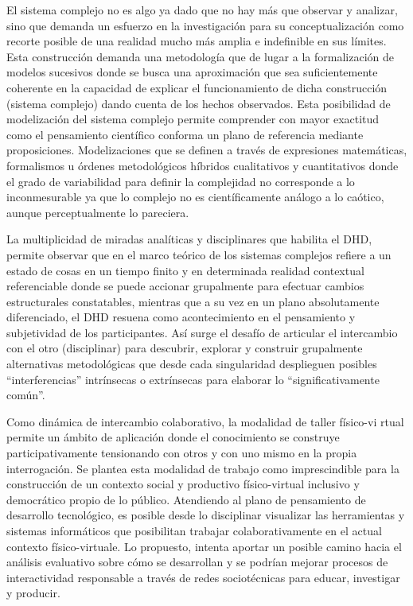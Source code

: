 El sistema complejo no es algo ya dado que no hay más que observar y analizar,
sino que demanda un esfuerzo en la investigación para su conceptualización como
recorte posible de una realidad mucho más amplia e indefinible en sus límites.
Esta construcción demanda una metodología que de lugar a la formalización de
modelos  sucesivos  donde   se  busca   una   aproximación  que   sea
suficientemente coherente en la capacidad de explicar el funcionamiento
de dicha construcción (sistema complejo) dando cuenta de los hechos
observados. Esta posibilidad de modelización del sistema complejo permite
comprender con mayor exactitud como el pensamiento científico conforma
un plano de referencia mediante proposiciones. Modelizaciones que se
definen a través de expresiones matemáticas, formalismos u órdenes
metodológicos híbridos cualitativos y cuantitativos donde el grado de
variabilidad  para definir la  complejidad  no  corresponde   a   lo
inconmesurable ya que lo complejo no es científicamente análogo a lo
caótico, aunque perceptualmente lo pareciera.



La multiplicidad de miradas analíticas y disciplinares que habilita el
DHD, permite observar que en el marco teórico de los sistemas complejos
refiere a un estado de cosas en un tiempo finito y en determinada realidad
contextual referenciable donde se puede accionar grupalmente para
efectuar cambios estructurales constatables, mientras que a su vez en un
plano absolutamente diferenciado, el DHD resuena como acontecimiento
en el pensamiento y subjetividad de los participantes. Así surge el desafío
de articular el intercambio con el otro (disciplinar) para descubrir, explorar
y construir grupalmente alternativas metodológicas que desde cada
singularidad desplieguen posibles “interferencias” intrínsecas o extrínsecas
para elaborar lo “significativamente común”.

Como dinámica de intercambio colaborativo, la modalidad de taller físico-vi
rtual permite un ámbito de aplicación donde el conocimiento se construye
participativamente tensionando con otros y con uno mismo en la propia
interrogación. Se plantea esta modalidad de trabajo como imprescindible para la
construcción de un contexto social y productivo físico-virtual inclusivo y
democrático propio de lo público. Atendiendo al plano de pensamiento de
desarrollo tecnológico, es posible desde lo disciplinar visualizar las
herramientas y sistemas informáticos que posibilitan trabajar colaborativamente
en el actual contexto físico-virtuale. Lo propuesto, intenta aportar un posible
camino hacia el análisis evaluativo sobre cómo se desarrollan y se podrían
mejorar procesos de interactividad responsable a través de redes sociotécnicas
para educar, investigar y producir. 


